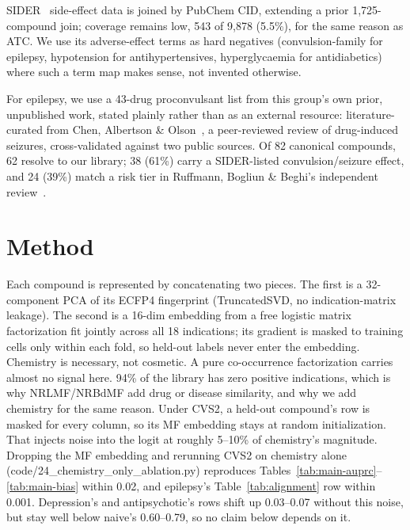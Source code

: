 \documentclass{llncs}
\begin{document}
SIDER~\cite{kuhn2016sider} side-effect data is joined by PubChem CID, extending a prior 1{,}725-compound join; coverage remains low, 543 of 9{,}878 (5.5\%), for the same reason as ATC. We use its adverse-effect terms as hard negatives (convulsion-family for epilepsy, hypotension for antihypertensives, hyperglycaemia for antidiabetics) where such a term map makes sense, not invented otherwise.

For epilepsy, we use a 43-drug proconvulsant list from this group's own prior, unpublished work, stated plainly rather than as an external resource: literature-curated from Chen, Albertson \& Olson~\cite{chen2016druginducedseizures}, a peer-reviewed review of drug-induced seizures, cross-validated against two public sources. Of 82 canonical compounds, 62 resolve to our library; 38 (61\%) carry a SIDER-listed convulsion/seizure effect, and 24 (39\%) match a risk tier in Ruffmann, Bogliun \& Beghi's independent review~\cite{ruffmann2006epileptogenic}.

\section{Method}
\label{sec:method}
Each compound is represented by concatenating two pieces. The first is a 32-component PCA of its ECFP4 fingerprint (TruncatedSVD, no indication-matrix leakage). The second is a 16-dim embedding from a free logistic matrix factorization fit jointly across all 18 indications; its gradient is masked to training cells only within each fold, so held-out labels never enter the embedding. Chemistry is necessary, not cosmetic. A pure co-occurrence factorization carries almost no signal here. 94\% of the library has zero positive indications, which is why NRLMF/NRBdMF add drug or disease similarity, and why we add chemistry for the same reason. Under CVS2, a held-out compound's row is masked for every column, so its MF embedding stays at random initialization. That injects noise into the logit at roughly 5--10\% of chemistry's magnitude. Dropping the MF embedding and rerunning CVS2 on chemistry alone (code/24\_chemistry\_only\_ablation.py) reproduces Tables~\ref{tab:main-auprc}--\ref{tab:main-bias} within 0.02, and epilepsy's Table~\ref{tab:alignment} row within 0.001. Depression's and antipsychotic's rows shift up 0.03--0.07 without this noise, but stay well below naive's 0.60--0.79, so no claim below depends on it.
\end{document}
